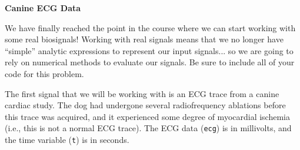 \item {\bf Canine ECG Data} 

We have finally reached the point in the
course where we can start working with some real biosignals!  Working with real
signals means that we no longer have ``simple'' analytic expressions to
represent our input signals... so we are going to rely on numerical methods to
evaluate our signals.  Be sure to include all of your code for this problem.

The first signal that we will be working with is an ECG trace from a canine
cardiac study.  The dog had undergone several radiofrequency ablations before
this trace was acquired, and it experienced some degree of myocardial ischemia
(i.e., this is not a normal ECG trace).  The ECG data (\verb+ecg+) is in
millivolts, and the time variable (\verb+t+) is in seconds.

